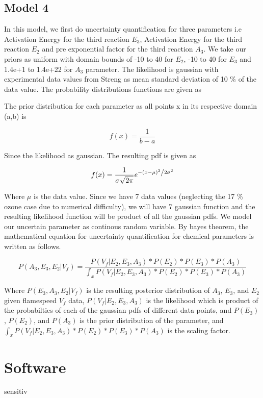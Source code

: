 \subsection{Model 4}


\noindent In this model, we first do uncertainty quantification for three parameters i.e Activation Energy for the third reaction $E_3$, Activation Energy for the third reaction $E_2$  and pre exponential factor for the third reaction $A_3$. We take our priors as uniform with domain bounds of -10 to 40 for $E_2$, -10 to 40 for $E_3$  and 1.4e+1 to 1.4e+22 for $A_3$  parameter. The likelihood is gaussian with experimental data values from Streng\cite{Streng} as mean standard deviation of 10 \% of the data value. The probability distributions functions are given as

\nonident The prior distribution for each parameter as all points x in its respective domain (a,b) is 

$$f(x) = \frac{1}{b -a}$$


\noindent Since the likelihood as gaussian. The resulting pdf is given as 

$$f(x) = \frac{1}{{\sigma \sqrt {2\pi } }}e^{{{ - \left( {x - \mu } \right)^2 } \mathord{\left/ {\vphantom {{ - \left( {x - \mu } \right)^2 } {2\sigma ^2 }}} \right. \kern-\nulldelimiterspace} {2\sigma ^2 }}} $$

  
\noindent Where $\mu$ is the data value. Since we have 7 data values (neglecting the 17 \% ozone case due to numerical difficulty), we will have 7 gaussian function and the resulting likelihood function will be product of all the gaussian pdfs. We model our uncertain parameter as continous random variable. By bayes theorem, the mathematical equation for uncertainty quantification for chemical parameters is written as follows. 

 $$P( A_3, E_3,E_2 |V_f ) = \frac{P(V_f| E_2,E_3,A_3)* P(E_2)*P(E_3)* P(A_3)}{\int_x P(V_f|E_2,E_3,A_3)* P(E_2)*P(E_3)*P(A_3)}$$ 
 
 \noindent Where  $P(E_3,A_3,E_2 |V_f)$ is the resulting posterior distribution of $A_3$, $E_3$,  and $E_2$ given flamespeed $V_f$ data, $P(V_f| E_2, E_3 ,A_3)$ is the likelihood which is product of the probabilties of each of the gaussian pdfs of different data points, and $P(E_3)$, $P(E_2)$, and $P(A_3)$ is the prior distribution of the parameter, and $\int_x P(V_f|E_2,E_3,A_3)* P(E_2)*P(E_3)*P(A_3)$ is the scaling factor.


\section{Software} sensitiv
